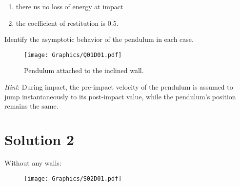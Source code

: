 \documentclass[twoside,10pt,a4paper]{article}
\begin{document}
\begin{enumerate}[label=(\roman*)]
	\item there us no loss of energy at impact
	\item the coefficient of restitution is 0.5.
\end{enumerate}
Identify the asymptotic behavior of the pendulum in each case.

\begin{figure}[H]
	\centering
	\texttt{[image: Graphics/Q01D01.pdf]}
	\caption{Pendulum attached to the inclined wall.}
	\label{Q01D01}
\end{figure}

\textit{Hint}: During impact, the pre-impact velocity of the pendulum is assumed to jump instantaneously to its post-impact value, while the pendulum's position remains the same.

\section*{Solution 2}
Without any walls:
\begin{figure}[H]
	\centering
	\texttt{[image: Graphics/S02D01.pdf]}
\end{figure}
\end{document}
